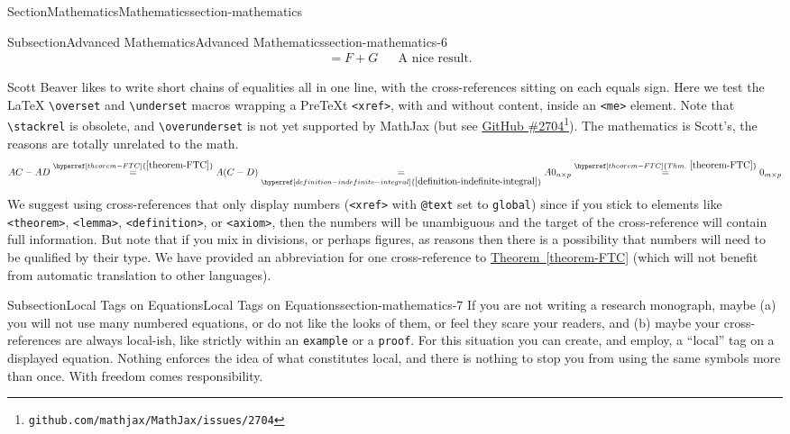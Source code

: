 \documentclass[twoside,10pt,]{article}
\newcommand{\xreffont}{\relax}
\newcommand{\mono}[1]{\texttt{#1}}
\numberwithin{equation}{section}
\begin{document}
\begin{sectionptx}{Section}{Mathematics}{}{Mathematics}{}{}{section-mathematics}
\begin{subsectionptx}{Subsection}{Advanced Mathematics}{}{Advanced Mathematics}{}{}{section-mathematics-6}
\begin{align*}
&=F+G&&\hyperref[theorem-number-01]{\text{A nice result}}\text{.}
\end{align*}
%
\par
Scott Beaver likes to write short chains of equalities all in one line, with the cross-references sitting on each equals sign.  Here we test the \LaTeX{} \mono{\textbackslash{}overset} and \mono{\textbackslash{}underset} macros wrapping a PreTeXt \mono{<xref>}, with and without content, inside an \mono{<me>} element.  Note that  \mono{\textbackslash{}stackrel} is obsolete, and \mono{\textbackslash{}overunderset} is not yet supported by MathJax (but see \href{https://github.com/mathjax/MathJax/issues/2704}{GitHub \#2704}\footnote{\nolinkurl{github.com/mathjax/MathJax/issues/2704}\label{section-mathematics-6-6-10}}).  The mathematics is Scott's, the reasons are totally unrelated to the math.%
\begin{equation*}
AC-AD
\overset{\hyperref[theorem-FTC]{{\xreffont\ref{theorem-FTC}}}}{=}
A(C-D)
\underset{\hyperref[definition-indefinite-integral]{{\xreffont\ref{definition-indefinite-integral}}}}{=}
A0_{n\times p}
\overset{\hyperref[theorem-FTC]{Thm.~{\xreffont\ref{theorem-FTC}}}}{=}
0_{m\times p}
\end{equation*}
We suggest using cross-references that only display numbers (\mono{<xref>} with \mono{@text} set to \mono{global}) since if you stick to elements like \mono{<theorem>}, \mono{<lemma>}, \mono{<definition>}, or \mono{<axiom>}, then the numbers will be unambiguous and the target of the cross-reference will contain full information.  But note that if you mix in divisions, or perhaps figures, as reasons then there is a possibility that numbers will need to be qualified by their type.  We have provided an abbreviation for one cross-reference to \hyperref[theorem-FTC]{Theorem~{\xreffont\ref{theorem-FTC}}} (which will not benefit from automatic translation to other languages).%
\end{subsectionptx}
%
%
\typeout{************************************************}
\typeout{************************************************}
%
\begin{subsectionptx}{Subsection}{Local Tags on Equations}{}{Local Tags on Equations}{}{}{section-mathematics-7}
If you are not writing a research monograph, maybe (a) you will not use many numbered equations, or do not like the looks of them, or feel they scare your readers, and (b) maybe your cross-references are always local-ish, like strictly within an \mono{example} or a \mono{proof}.  For this situation you can create, and employ, a ``local'' tag on a displayed equation.  Nothing enforces the idea of what constitutes local, and there is nothing to stop you from using the same symbols more than once.  With freedom comes responsibility.%

\end{subsectionptx}
\end{sectionptx}
\end{document}
